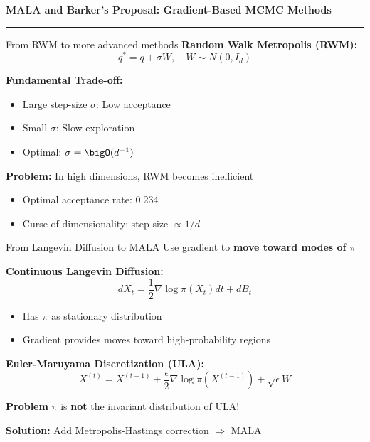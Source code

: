 \begin{frame}
	\vspace{2cm}
	\begin{center}
		{\Huge\textbf{\textcolor{copenhagenred}{MALA and Barker's Proposal: Gradient-Based MCMC Methods}}}
		\vspace{1cm}

		\rule{4cm}{3pt}
		\vspace{2cm}
	\end{center}
\end{frame}

\begin{frame}{From RWM to more advanced methods}
	\textbf{Random Walk Metropolis (RWM):}
	$$q^* = q + \sigma W, \quad W \sim N(0, I_d)$$

	\textbf{Fundamental Trade-off:}
	\begin{itemize}
		\item Large step-size $\sigma$: Low acceptance
		\item Small $\sigma$: Slow exploration
		\item Optimal: $\sigma = \bigO(d^{-1})$
	\end{itemize}

	\vspace{1em}
	\textbf{Problem:} In high dimensions, RWM becomes inefficient
	\begin{itemize}
		\item Optimal acceptance rate: 0.234
		\item Curse of dimensionality: step size $\propto 1/d$
	\end{itemize}
\end{frame}

\begin{frame}{From Langevin Diffusion to MALA}
	Use gradient to \textbf{move toward modes of $\pi$}

	\textbf{Continuous Langevin Diffusion:}
	$$dX_t = \frac{1}{2}\nabla\log\pi(X_t)dt + dB_t$$

	\begin{itemize}
		\item Has $\pi$ as stationary distribution
		\item Gradient provides moves toward high-probability regions
	\end{itemize}

	\vspace{0.5em}

	\textbf{Euler-Maruyama Discretization (ULA):}
	$$X^{(t)} = X^{(t-1)} + \frac{\epsilon}{2}\nabla\log\pi(X^{(t-1)}) + \sqrt{\epsilon}W$$

	\textbf{Problem} $\pi$ is \textbf{not} the invariant distribution of ULA!

	\textbf{Solution:} Add Metropolis-Hastings correction $\Rightarrow$ MALA
\end{frame}

